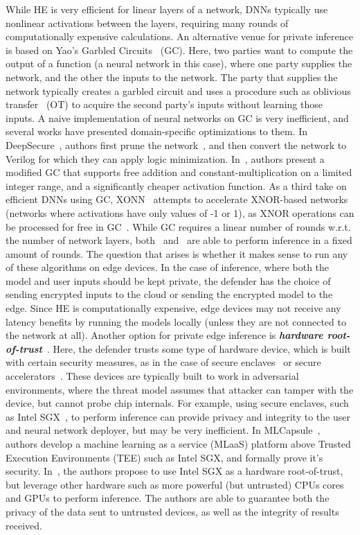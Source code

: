 While HE is very efficient for linear layers of a network, DNNs typically use nonlinear activations between the layers, requiring many rounds of computationally expensive calculations. An alternative venue for private inference is based on Yao's Garbled Circuits~ (GC). Here, two parties want to compute the output of a function (a neural network in this case), where one party supplies the network, and the other the inputs to the network. The party that supplies the network typically creates a garbled circuit and uses a procedure such as oblivious transfer~ (OT) to acquire the second party's inputs without learning those inputs. A naive implementation of neural networks on GC is very inefficient, and several works have presented domain-specific optimizations to them. In DeepSecure~, authors first prune the network~, and then convert the network to Verilog for which they can apply logic minimization. In~, authors present a modified GC that supports free addition and constant-multiplication on a limited integer range, and a significantly cheaper activation function.  
As a third take on efficient DNNs using GC, XONN~ attempts to accelerate XNOR-based networks~ (networks where activations have only values of -1 or 1), as XNOR operations can be processed for free in GC~. While GC requires a linear number of rounds w.r.t. the number of network layers, both~ and~ are able to perform inference in a fixed amount of rounds.
The question that arises is whether it makes sense to run any of these algorithms on edge devices. In the case of inference, where both the model and user inputs should be kept private, the defender has the choice of sending encrypted inputs to the cloud or sending the encrypted model to the edge. Since HE is computationally expensive, edge devices may not receive any latency benefits by running the models locally (unless they are not connected to the network at all). 
Another option for private edge inference is \textbf{\textit{hardware root-of-trust}}~. Here, the defender trusts some type of hardware device, which is built with certain security measures, as in the case of secure enclaves~ or secure accelerators~. These devices are typically built to work in adversarial environments, where the threat model assumes that attacker can tamper with the device, but cannot probe chip internals.
For example, using secure enclaves, such as Intel SGX~, to perform inference can provide privacy and integrity to the user and neural network deployer, but may be very inefficient. In MLCapsule~, authors develop a machine learning as a service (MLaaS) platform above Trusted Execution Environments (TEE) such as Intel SGX, and formally prove it's security. In~, the authors propose to use Intel SGX as a hardware root-of-trust, but leverage other hardware such as more powerful (but untrusted) CPUs cores and GPUs to perform inference. The authors are able to guarantee both the privacy of the data sent to untrusted devices, as well as the integrity of results received.
